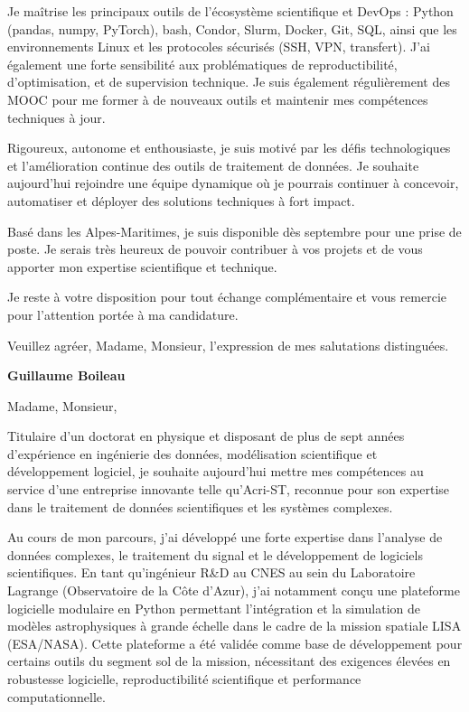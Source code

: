 \documentclass[10pt,a4paper]{altacv}
\begin{document}
{Je maîtrise les principaux outils de l'écosystème scientifique et DevOps : Python (pandas, numpy, PyTorch), bash, Condor, Slurm, Docker, Git, SQL, ainsi que les environnements Linux et les protocoles sécurisés (SSH, VPN, transfert). J'ai également une forte sensibilité aux problématiques de reproductibilité, d'optimisation, et de supervision technique. Je suis également régulièrement des MOOC pour me former à de nouveaux outils et maintenir mes compétences techniques à jour.

Rigoureux, autonome et enthousiaste, je suis motivé par les défis technologiques et l'amélioration continue des outils de traitement de données. Je souhaite aujourd'hui rejoindre une équipe dynamique où je pourrais continuer à concevoir, automatiser et déployer des solutions techniques à fort impact.

Basé dans les Alpes-Maritimes, je suis disponible dès septembre pour une prise de poste. Je serais très heureux de pouvoir contribuer à vos projets et de vous apporter mon expertise scientifique et technique.

Je reste à votre disposition pour tout échange complémentaire et vous remercie pour l'attention portée à ma candidature.

Veuillez agréer, Madame, Monsieur, l'expression de mes salutations distinguées.

\textbf{Guillaume Boileau}



}

Madame, Monsieur,

Titulaire d’un doctorat en physique et disposant de plus de sept années d’expérience en ingénierie des données, modélisation scientifique et développement logiciel, je souhaite aujourd’hui mettre mes compétences au service d’une entreprise innovante telle qu’Acri-ST, reconnue pour son expertise dans le traitement de données scientifiques et les systèmes complexes.

Au cours de mon parcours, j’ai développé une forte expertise dans l’analyse de données complexes, le traitement du signal et le développement de logiciels scientifiques. En tant qu’ingénieur R\&D au CNES au sein du Laboratoire Lagrange (Observatoire de la Côte d’Azur), j’ai notamment conçu une plateforme logicielle modulaire en Python permettant l’intégration et la simulation de modèles astrophysiques à grande échelle dans le cadre de la mission spatiale LISA (ESA/NASA). Cette plateforme a été validée comme base de développement pour certains outils du segment sol de la mission, nécessitant des exigences élevées en robustesse logicielle, reproductibilité scientifique et performance computationnelle.
\end{document}
